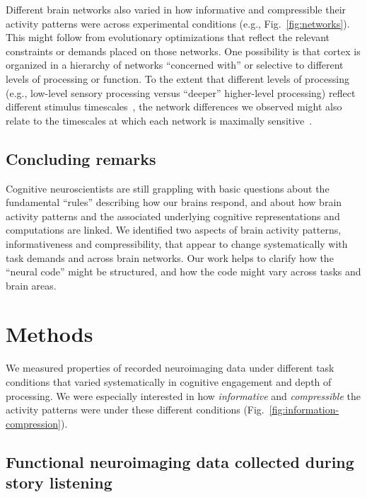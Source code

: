 \documentclass[english, 11pt]{article}
\begin{document}
Different brain networks also varied in how informative and compressible their
activity patterns were across experimental conditions (e.g.,
Fig.~\ref{fig:networks}). This might follow from evolutionary optimizations
that reflect the relevant constraints or demands placed on those networks. One
possibility is that cortex is organized in a hierarchy of networks ``concerned
with'' or selective to different levels of processing or function. To the
extent that different levels of processing (e.g., low-level sensory processing
versus ``deeper'' higher-level processing) reflect different stimulus
timescales~\citep[e.g.,][]{Mann20}, the network differences we observed might
also relate to the timescales at which each network is maximally
sensitive~\citep{RegeEtal18, BaldEtal17,LernEtal11, HassEtal08}.

\subsection*{Concluding remarks}

Cognitive neuroscientists are still grappling with basic questions about the
fundamental ``rules'' describing how our brains respond, and about how brain
activity patterns and the associated underlying cognitive representations and
computations are linked. We identified two aspects of brain activity patterns,
informativeness and compressibility, that appear to change systematically with
task demands and across brain networks. Our work helps to clarify how the
``neural code'' might be structured, and how the code might vary across tasks
and brain areas.

\section*{Methods}

We measured properties of recorded neuroimaging data under different task
conditions that varied systematically in cognitive engagement and depth of
processing. We were especially interested in how \textit{informative} and
\textit{compressible} the activity patterns were under these different
conditions (Fig.~\ref{fig:information-compression}).


\subsection*{Functional neuroimaging data collected during story
  listening}
\end{document}
